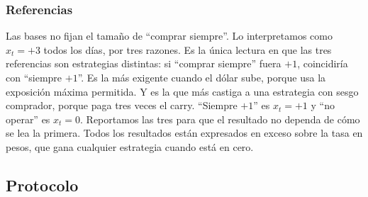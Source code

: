 \documentclass[10pt,a4paper]{article}
\begin{document}
\subsubsection{Referencias}

Las bases no fijan el tamaño de ``comprar siempre''. Lo interpretamos como $x_t=+3$ todos
los días, por tres razones. Es la única lectura en que las tres referencias son
estrategias distintas: si ``comprar siempre'' fuera $+1$, coincidiría con ``siempre $+1$''.
Es la más exigente cuando el dólar sube, porque usa la exposición máxima permitida. Y es
la que más castiga a una estrategia con sesgo comprador, porque paga tres veces el
carry. ``Siempre $+1$'' es $x_t=+1$ y ``no operar'' es $x_t=0$. Reportamos las tres para que
el resultado no dependa de cómo se lea la primera. Todos los resultados están
expresados en exceso sobre la tasa en pesos, que gana cualquier estrategia cuando está
en cero.

\subsection{Protocolo}\label{sec:protocolo}
\end{document}

